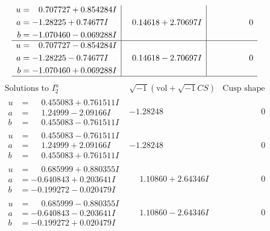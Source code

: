\documentclass[1p]{elsarticle_modified}
\theoremstyle{definition}
\newcommand{\I}{\sqrt{-1}}
\begin{document}
$$\begin{array}{c|c|c}
\begin{aligned}
u &= \phantom{-}0.707727 + 0.854284 I \\
a &= -1.28225 + 0.74677 I \\
b &= -1.070460 - 0.069288 I\end{aligned}
 & \phantom{-}0.14618 + 2.70697 I & \phantom{-0.000000 } 0 \\ \hline\begin{aligned}
u &= \phantom{-}0.707727 - 0.854284 I \\
a &= -1.28225 - 0.74677 I \\
b &= -1.070460 + 0.069288 I\end{aligned}
 & \phantom{-}0.14618 - 2.70697 I & \phantom{-0.000000 } 0\\
 \hline 
 \end{array}$$\newpage$$\begin{array}{c|c|c}  
\text{Solutions to }I^u_{2}& \I (\text{vol} + \sqrt{-1}CS) & \text{Cusp shape}\\
 \hline 
\begin{aligned}
u &= \phantom{-}0.455083 + 0.761511 I \\
a &= \phantom{-}1.24999 - 2.09166 I \\
b &= \phantom{-}0.455083 - 0.761511 I\end{aligned}
 & -1.28248\phantom{ +0.000000I} & \phantom{-0.000000 } 0 \\ \hline\begin{aligned}
u &= \phantom{-}0.455083 - 0.761511 I \\
a &= \phantom{-}1.24999 + 2.09166 I \\
b &= \phantom{-}0.455083 + 0.761511 I\end{aligned}
 & -1.28248\phantom{ +0.000000I} & \phantom{-0.000000 } 0 \\ \hline\begin{aligned}
u &= \phantom{-}0.685999 + 0.880355 I \\
a &= -0.640843 + 0.203641 I \\
b &= -0.199272 - 0.020479 I\end{aligned}
 & \phantom{-}1.10860 + 2.64346 I & \phantom{-0.000000 } 0 \\ \hline\begin{aligned}
u &= \phantom{-}0.685999 - 0.880355 I \\
a &= -0.640843 - 0.203641 I \\
b &= -0.199272 + 0.020479 I\end{aligned}
 & \phantom{-}1.10860 - 2.64346 I & \phantom{-0.000000 } 0 \\ \hline\begin{aligned}

\end{aligned}
\end{array}$$
\end{document}
